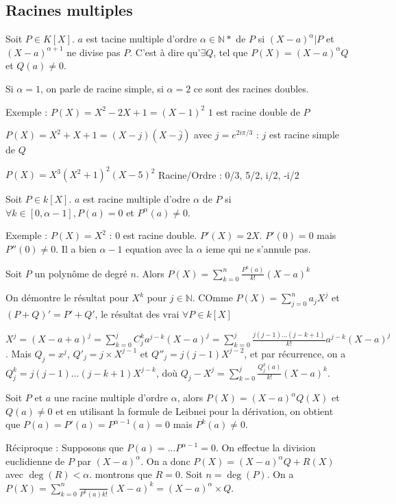 \documentclass[french]{yLectureNote}
\begin{document}
\subsection{Racines multiples}
\begin{definition}
Soit $P\in K[X]$. $a$ est tacine multiple d'ordre $\alpha \in \mathbb{N}*$ de $P$ si $(X-a)^{\alpha}|P$ et $(X-a)^{\alpha+1}$ ne divise pas $P$. C'est à dire qu'$\exists Q$, tel que $P(X) = (X-a)^\alpha Q$ et $Q(a)\neq 0$.
\end{definition}
Si $\alpha = 1$, on parle de racine simple, si $\alpha = 2$ ce sont des racines doubles.

Exemple : $P(X) = X^2-2X+1 = (X-1)^2$ $1$ est racine double de $P$

$P(X) = X^2+X+1 = (X-j)(X-\bar{j})$ avec $j = e^{2i\pi/3}$ : $j$ est racine simple de $Q$

$P(X) = X^3(X^2+1)^2(X-5)^2$
Racine/Ordre : 0/3, 5/2, i/2, -i/2

\begin{theorem}
Soit $P\in k[X]$. $a$ est racine multiple d'odre $\alpha$ de $P$ si $\forall k\in[0,\alpha-1], P(a) = 0$ et $P^\alpha(a) \neq 0$.
\end{theorem}
Exemple : $P(X) = X^2$ : $0$ est racine double. $P'(X)=2X$. $P'(0)=0$ mais $P''(0)\neq 0$. Il a bien $\alpha-1$ equation avec la $\alpha$ ieme qui ne s'annule pas.
\begin{lemma}
Soit $P$ un polyn\^ome de degré $n$. Alors $P(X) = \sum_{k=0}^n \frac{P^k(a)}{k!}(X-a)^k$
\end{lemma}
\begin{myproof}
On démontre le résultat pour $X^k$ pour $j\in\mathbb{N}$. COmme $P(X) = \sum^{n}_{j=0}a_jX^j$ et $(P+Q)' = P'+Q'$, le résultat des vrai $\forall P\in k[X]$

$X^j = (X-a+a)^j = \sum_{k=0}^j C^k_ja^{j-k}(X-a)^j = \sum^j_{k=0}\frac{j(j-1)\dots(j-k+1)}{k!}a^{j-k}(X-a)^j$. Mais $Q_j = x^j$, $Q'_j = j\times X^{j-1}$ et $Q''_j = j(j-1)X^{j-2}$, et par récurrence, on a $Q_j^{k} = j(j-1)\dots(j-k+1)X^{j-k}$, doù $Q_j - X^j = \sum_{k=0}^j \frac{Q_j^{k}(a)}{k!}(X-a)^k$.
\end{myproof}
\begin{myproof}
Soit $P$ et $a$ une racine multiple d'ordre $\alpha$, alors $P(X)=(X-a)^\alpha Q(X)$ et $Q(a)\neq 0$ et en utilisant la formule de Leibnei pour la dérivation, on obtient que $P(a) = P'(a) = P^{\alpha-1}(a) = 0$ mais $P^k(a)\neq 0$.

Réciproque : Supposons que $P(a) = \dots P^{\alpha-1} =0$. On effectue la division euclidienne de $P$ par $(X-a)^\alpha$. On a donc $P(X) = (X-a)^\alpha Q+R(X)$ avec $\deg(R)<\alpha$. montrons que $R = 0$. Soit $n = \deg(P)$. On a $P(X) = \sum_{k=0}^n\frac{}{P^k(a)k!}(X-a)^k  = (X-a)^\alpha \times Q$.
\end{myproof}
\end{document}
